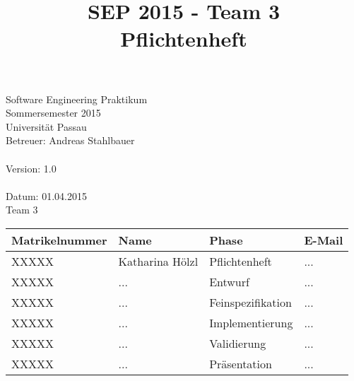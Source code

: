 \documentclass[a4paper]{scrreprt}
\begin{document}
	\thispagestyle{plain}

\begin{titlepage}
    \begin{center}

    	\begin{title}
        	\title{\Huge{\textbf{SEP 2015 - Team 3 \\ Pflichtenheft\\}}}

		\end{title}
		\hspace{3cm}

        	Software Engineering Praktikum \\
        	Sommersemester 2015\\
        	Universität Passau\\


        	Betreuer: Andreas Stahlbauer \\
        	\hspace{1,5cm}\\
        	Version: 1.0 \\
        	\hspace{1,5cm}\\
        	Datum: 01.04.2015\\[50pt]
        	Team 3 \\
    
        
        \begin{tabular}{ | l | l | l | l |}
            \hline
            \textbf{Matrikelnummer} & \textbf{Name} & \textbf{Phase} & \textbf{E-Mail}  \\ \hline
            XXXXX & Katharina Hölzl & Pflichtenheft & ... \\ \hline
            XXXXX & ... & Entwurf & ...  \\ \hline
            XXXXX & ... & Feinspezifikation  & ... \\ \hline
            XXXXX & ... & Implementierung  &  ... \\ \hline
            XXXXX & ... & Validierung & ... \\ \hline  
            XXXXX & ... &  Präsentation & ... \\ \hline
        \end{tabular}
    \end{center}
\end{titlepage}
 
 

\tableofcontents
 
\printglossaries
\end{document}
